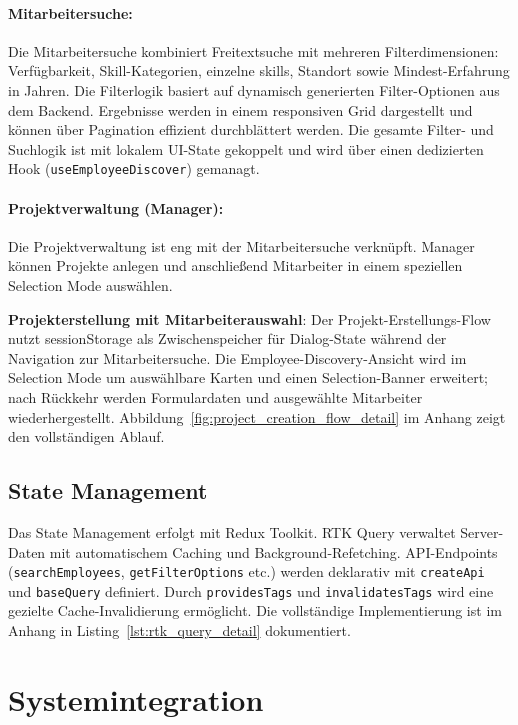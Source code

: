 \paragraph{Mitarbeitersuche:}
Die Mitarbeitersuche kombiniert Freitextsuche mit mehreren Filterdimensionen: Verfügbarkeit, Skill-Kategorien, einzelne \glspl{skill}, Standort sowie Mindest-Erfahrung in Jahren. Die Filterlogik basiert auf dynamisch generierten Filter-Optionen aus dem Backend. Ergebnisse werden in einem responsiven Grid dargestellt und können über Pagination effizient durchblättert werden. Die gesamte Filter- und Suchlogik ist mit lokalem UI-State gekoppelt und wird über einen dedizierten Hook (\texttt{useEmployeeDiscover}) gemanagt.

\paragraph{Projektverwaltung (Manager):}
Die Projektverwaltung ist eng mit der Mitarbeitersuche verknüpft. Manager können Projekte anlegen und anschließend Mitarbeiter in einem speziellen \glqq Selection Mode\grqq{} auswählen.

\textbf{Projekterstellung mit Mitarbeiterauswahl}: Der Projekt-Erstellungs-Flow nutzt sessionStorage als Zwischenspeicher für Dialog-State während der Navigation zur Mitarbeitersuche. Die Employee-Discovery-Ansicht wird im Selection Mode um auswählbare Karten und einen Selection-Banner erweitert; nach Rückkehr werden Formulardaten und ausgewählte Mitarbeiter wiederhergestellt. Abbildung~\ref{fig:project_creation_flow_detail} im Anhang zeigt den vollständigen Ablauf.

\subsection{State Management}

Das State Management erfolgt mit Redux Toolkit. RTK Query verwaltet Server-Daten mit automatischem Caching und Background-Refetching. API-Endpoints (\texttt{searchEmployees}, \texttt{getFilterOptions} etc.) werden deklarativ mit \texttt{createApi} und \texttt{baseQuery} definiert. Durch \texttt{providesTags} und \texttt{invalidatesTags} wird eine gezielte Cache-Invalidierung ermöglicht. Die vollständige Implementierung ist im Anhang in Listing~\ref{lst:rtk_query_detail} dokumentiert.

\section{Systemintegration}

